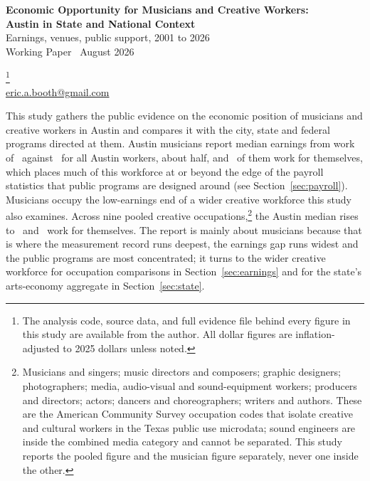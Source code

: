 \thispagestyle{empty}

\begin{bannerbox}
\color{white}
{\fontsize{15}{18}\selectfont\sffamily\bfseries Economic Opportunity for Musicians and Creative Workers:\\Austin in State and National Context}\\[4pt]
{\fontsize{11.5}{14}\selectfont\sffamily Earnings, venues, public support, 2001 to 2026}\\[5pt]
{\footnotesize\color{amlightbg}Working Paper \textbar\ August 2026}
\end{bannerbox}

\vspace{7pt}

\footnote{The analysis code, source
data, and full evidence file behind every figure in this study are available
from the author. All dollar figures are inflation-adjusted to 2025 dollars
unless noted.}\\[1pt]
{\footnotesize\color{ammuted}\href{mailto:eric.a.booth@gmail.com}{eric.a.booth@gmail.com}}

\vspace{8pt}

\noindent This study gathers the public evidence on the economic position of
musicians and creative workers in Austin and compares it with the city, state
and federal programs directed at them. Austin musicians report median earnings
from work of \NPumsAustinMusMedpernpPos\ against
\NPumsAustinAllworkMedpernpPos\ for all Austin workers, about half, and
\NPumsAustinMusSelfemp\ of them work for themselves, which places much of this
workforce at or beyond the edge of the payroll statistics that public programs
are designed around (see Section~\ref{sec:payroll}). Musicians occupy the
low-earnings end of a wider creative workforce this study
also examines. Across nine pooled creative occupations,\footnote{Musicians and
singers; music directors and composers; graphic designers; photographers;
media, audio-visual and sound-equipment workers; producers and directors;
actors; dancers and choreographers; writers and authors. These are the American
Community Survey occupation codes that isolate creative and cultural workers in
the Texas public use microdata; sound engineers are inside the combined media
category and cannot be separated. This study reports the pooled figure and the
musician figure separately, never one inside the other.} the Austin median
rises to \NPumsAustinCreativeMedpernpPos\ and
\NPumsAustinCreativeSelfemp\ work for themselves. The report is mainly about
musicians because that is where the measurement record runs deepest, the
earnings gap runs widest and the public programs are most concentrated; it
turns to the wider creative workforce for occupation comparisons in
Section~\ref{sec:earnings} and for the state's arts-economy aggregate in
Section~\ref{sec:state}.


